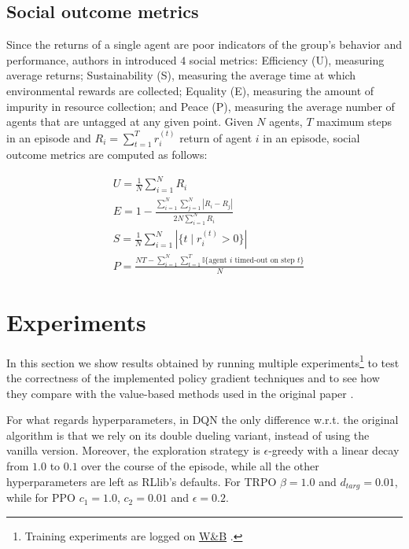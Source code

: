 \documentclass{article}
\begin{document}
\subsection{Social outcome metrics}
Since the returns of a single agent are poor indicators of the group's behavior and performance, authors in \cite{harvest} introduced $4$ social metrics: Efficiency (U), measuring average returns; Sustainability (S), measuring the average time at which environmental rewards are collected; Equality (E), measuring the amount of impurity in resource collection; and Peace (P), measuring the average number of agents that are untagged at any given point. Given $N$ agents, $T$ maximum steps in an episode and $R_i=\sum_{t=1}^T r_i^{(t)}$ return of agent $i$ in an episode, social outcome metrics are computed as follows:

\begin{equation}
  \label{eq:metrics}
  \begin{aligned}
    & U = \frac{1}{N}\sum_{i=1}^N R_i\\
    & E = 1 - \frac{\sum_{i=1}^N\sum_{j=1}^N |R_i-R_j|}{2N\sum_{i=1}^N R_i} \\
    & S = \frac{1}{N}\sum_{i=1}^N |\{t\mid r_i^{(t)}>0\}| \\
    & P = \frac{NT-\sum_{i=1}^N\sum_{t=1}^T \mathbb{I}\{\text{agent } i \text{ timed-out on step } t\}}{N}
  \end{aligned}
\end{equation}

\section{Experiments}
In this section we show results obtained by running multiple experiments\footnote{Training experiments are logged on \href{https://wandb.ai/wadaboa/cpr-appropriation}{W\&B} \cite{wandb}.} to test the correctness of the implemented policy gradient techniques and to see how they compare with the value-based methods used in the original paper \cite{harvest}.

For what regards hyperparameters, in DQN the only difference w.r.t. the original algorithm is that we rely on its double dueling variant, instead of using the vanilla version. Moreover, the exploration strategy is $\epsilon$-greedy with a linear decay from $1.0$ to $0.1$ over the course of the episode, while all the other hyperparameters are left as RLlib's defaults. For TRPO $\beta=1.0$ and $d_{targ}=0.01$, while for PPO $c_1=1.0$, $c_2=0.01$ and $\epsilon=0.2$.
\end{document}
